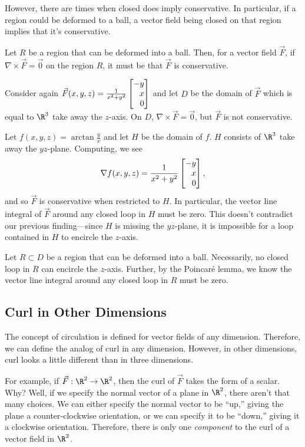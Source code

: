 However, there are times when closed does imply conservative.  In particular,
if a region could be deformed to a ball, a vector field
being closed on that region implies that it's conservative.

\begin{theorem}
	Let $R$ be a region that can be deformed into
	a ball.  Then, for a vector field $\vec F$,
	if $\nabla\times \vec F=\vec 0$ on the region $R$,
	it must be that $\vec F$ is conservative.
\end{theorem}

\begin{example}
	Consider again $\vec F(x,y,z) = \frac{1}{x^2+y^2}\mat{-y\\x\\0}$ and let $D$
	be the domain of $\vec F$ which is equal to $\R^3$ take away the $z$-axis.  On $D$, 
	$\nabla \times \vec F=\vec 0$, but $\vec F$ is not conservative.

	Let $f(x,y,z) = \arctan \frac{y}{x}$ and let $H$ be the domain of $f$.  $H$ consists of
	$\R^3$ take away the $yz$-plane.  Computing, we see
	\[
		\nabla f(x,y,z) = \frac{1}{x^2+y^2}\mat{-y\\x\\0},
	\]
	and so $\vec F$ is conservative when restricted to $H$.  In particular, the vector line
	integral of $\vec F$ around any closed loop in $H$ must be zero.  This doesn't contradict
	our previous finding---since $H$ is missing the $yz$-plane, it is impossible for a loop
	contained in $H$ to encircle the $z$-axis.

	Let $R\subset D$ be a region that can be deformed into a ball.  Necessarily, no closed loop in
	$R$ can encircle the $z$-axis.  Further, by the Poincar\'e lemma, we know the vector line
	integral around any closed loop in $R$ must be zero.
\end{example}

\subsection{Curl in Other Dimensions}

The concept of circulation is defined for vector fields of any dimension.
Therefore, we can define the analog of curl in any dimension.  However,
in other dimensions, curl looks a little different than in three dimensions.

For example, if $\vec F:\R^2\to\R^2$, then the curl of $\vec F$ takes the form
of a scalar.  Why?  Well, if we specify the normal vector of a plane in
$\R^2$, there aren't that many choices.  We can either specify the normal 
vector to be ``up,'' giving the plane a counter-clockwise orientation, or
we can specify it to be ``down,'' giving it a clockwise orientation.  Therefore,
there is only one \emph{component} to the curl of a vector field in $\R^2$.

